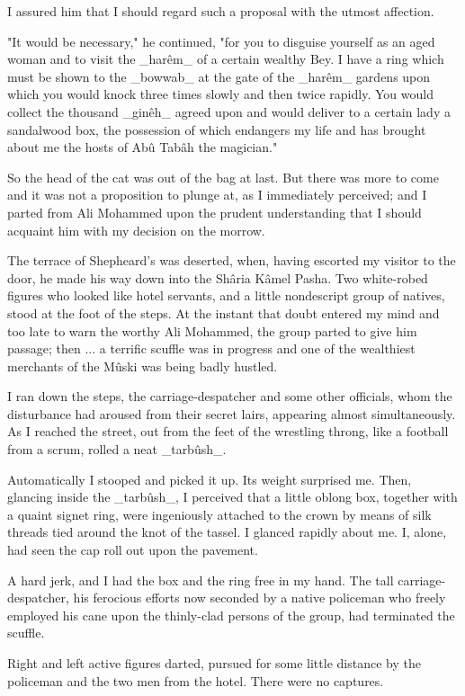 I assured him that I should regard such a proposal with the utmost
affection.

"It would be necessary," he continued, "for you to disguise yourself
as an aged woman and to visit the _harêm_ of a certain wealthy Bey.
I have a ring which must be shown to the _bowwab_ at the gate of the
_harêm_ gardens upon which you would knock three times slowly and then
twice rapidly. You would collect the thousand _ginêh_ agreed upon and
would deliver to a certain lady a sandalwood box, the possession of
which endangers my life and has brought about me the hosts of Abû
Tabâh the magician."

So the head of the cat was out of the bag at last. But there was more
to come and it was not a proposition to plunge at, as I immediately
perceived; and I parted from Ali Mohammed upon the prudent
understanding that I should acquaint him with my decision on the
morrow.

The terrace of Shepheard's was deserted, when, having escorted my
visitor to the door, he made his way down into the Shâria Kâmel Pasha.
Two white-robed figures who looked like hotel servants, and a little
nondescript group of natives, stood at the foot of the steps. At the
instant that doubt entered my mind and too late to warn the worthy
Ali Mohammed, the group parted to give him passage; then ... a
terrific scuffle was in progress and one of the wealthiest merchants
of the Mûski was being badly hustled.

I ran down the steps, the carriage-despatcher and some other
officials, whom the disturbance had aroused from their secret lairs,
appearing almost simultaneously. As I reached the street, out from the
feet of the wrestling throng, like a football from a scrum, rolled a
neat _tarbûsh_.

Automatically I stooped and picked it up. Its weight surprised me.
Then, glancing inside the _tarbûsh_, I perceived that a little oblong
box, together with a quaint signet ring, were ingeniously attached to
the crown by means of silk threads tied around the knot of the tassel.
I glanced rapidly about me. I, alone, had seen the cap roll out upon
the pavement.

A hard jerk, and I had the box and the ring free in my hand. The tall
carriage-despatcher, his ferocious efforts now seconded by a native
policeman who freely employed his cane upon the thinly-clad persons of
the group, had terminated the scuffle.

Right and left active figures darted, pursued for some little distance
by the policeman and the two men from the hotel. There were no
captures.

